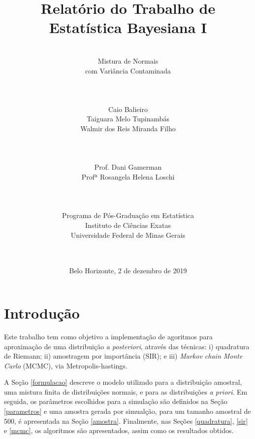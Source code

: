 \documentclass[12pt,reqno,a4paper,oneside, titlepage]{article}
\begin{document}
\title{\huge Relatório do Trabalho de\\
	Estatística Bayesiana I}
\author{\\
	\huge Mistura de Normais\\
	\huge com Variância Contaminada
	\\
	\\
	\\
	\\
	\Large Caio Balieiro\\
	\Large Taiguara Melo Tupinambás\\
	\Large Walmir dos Reis Miranda Filho\\
	\\
	\\
	\\
	\Large Prof. Dani Gamerman\\
	\Large Profª Rosangela Helena Loschi\\
	\\
	\\
	\\
	Programa de Pós-Graduação em Estatística\\
	Instituto de Ciências Exatas\\
	Universidade Federal de Minas Gerais\\
	\\
	\\}
\date{Belo Horizonte, 2 de dezembro de 2019}

\maketitle


\section{Introdução}

Este trabalho tem como objetivo a implementação de agoritmos para aproximação de uma distribuição \textit{a posteriori}, através das técnicas: i) quadratura de Riemann; ii) amostragem por importância (SIR); e iii) \textit{Markov chain Monte Carlo} (MCMC), via Metropolis-hastings. 

A Seção \ref{formulacao} descreve o modelo utilizado para a distribuição amostral, uma mistura finita de distribuições normais, e para as distribuições \textit{a priori}. Em seguida, os parâmetros escolhidos para a simulação são definidos na Seção \ref{parametros} e uma amostra gerada por simualção, para um tamanho amostral de 500, é apresentada na Seção \ref{amostra}. Finalmente, nas Seções \ref{quadratura}, \ref{sir} e \ref{mcmc}, os algoritmos são apresentados, assim como os resultados obtidos.
\end{document}
